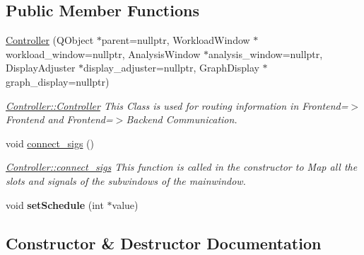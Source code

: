 \subsection*{Public Member Functions}
\begin{DoxyCompactItemize}
\item 
\hyperlink{classController_ac162dc9f74ef4ba011d7026b803c4f12}{Controller} (Q\+Object $\ast$parent=nullptr, Workload\+Window $\ast$workload\+\_\+window=nullptr, Analysis\+Window $\ast$analysis\+\_\+window=nullptr, Display\+Adjuster $\ast$display\+\_\+adjuster=nullptr, Graph\+Display $\ast$graph\+\_\+display=nullptr)
\begin{DoxyCompactList}\small\item\em \hyperlink{classController_ac162dc9f74ef4ba011d7026b803c4f12}{Controller\+::\+Controller} This Class is used for routing information in Frontend=$>$Frontend and Frontend=$>$Backend Communication. \end{DoxyCompactList}\item 
\mbox{\label{classController_a26511d6997388ccfe8f5ae02d49d9e6e}} 
void \hyperlink{classController_a26511d6997388ccfe8f5ae02d49d9e6e}{connect\+\_\+sigs} ()
\begin{DoxyCompactList}\small\item\em \hyperlink{classController_a26511d6997388ccfe8f5ae02d49d9e6e}{Controller\+::connect\+\_\+sigs} This function is called in the constructor to Map all the slots and signals of the subwindows of the mainwindow. \end{DoxyCompactList}\item 
\mbox{\label{classController_a57bd1103e450b49bfbbf452ab401c720}} 
void {\bfseries set\+Schedule} (int $\ast$value)
\end{DoxyCompactItemize}


\subsection{Constructor \& Destructor Documentation}
\mbox{\label{classController_ac162dc9f74ef4ba011d7026b803c4f12}} 
